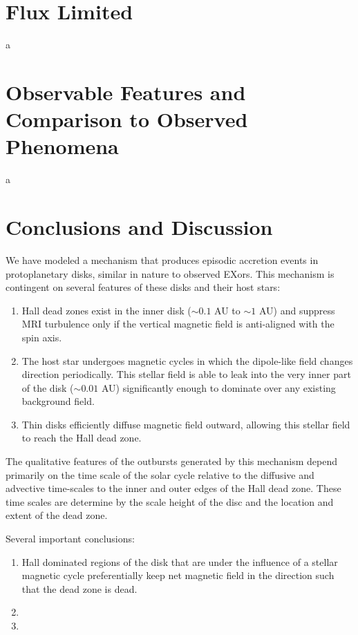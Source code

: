  
 
 
\newpage
\section{Flux Limited}
a




\newpage
\section{Observable Features and Comparison to Observed Phenomena}
a




\newpage
\section{Conclusions and Discussion}
We have modeled a mechanism that produces episodic accretion events in protoplanetary disks, similar in nature to observed EXors.  This mechanism is contingent on several features of these disks and their host stars:
\begin{enumerate}
\item{Hall dead zones exist in the inner disk ($\sim 0.1$ AU to $\sim 1$ AU) and suppress MRI turbulence only if the vertical magnetic field is anti-aligned with the spin axis. }
\item{The host star undergoes magnetic cycles in which the dipole-like field changes direction periodically.  This stellar field is able to leak into the very inner part of the disk ($\sim 0.01$ AU) significantly enough to dominate over any existing background field.}
\item{Thin disks efficiently diffuse magnetic field outward, allowing this stellar field to reach the Hall dead zone.}
\end{enumerate}

The qualitative features of the outbursts generated by this mechanism depend primarily on the time scale of the solar cycle relative to the diffusive and advective time-scales to the inner and outer edges of the Hall dead zone.  These time scales are determine by the scale height of the disc and the location and extent of the dead zone.

Several important conclusions:
\begin{enumerate}
\item{Hall dominated regions of the disk that are under the influence of a stellar magnetic cycle preferentially keep net magnetic field in the direction such that the dead zone is dead.}
\item{}
\item{}
\end{enumerate}

















